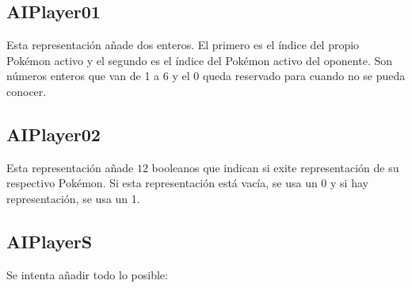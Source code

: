 \subsection*{AIPlayer01}

Esta representación añade dos enteros. El primero es el índice del propio Pokémon activo y el segundo es el índice del Pokémon activo del oponente. Son números enteros que van de 1 a 6 y el 0 queda reservado para cuando no se pueda conocer.

\subsection*{AIPlayer02}

Esta representación añade $12$ booleanos que indican si exite representación de su respectivo Pokémon. Si esta representación está vacía, se usa un 0 y si hay representación, se usa un 1.

\subsection*{AIPlayerS}

Se intenta añadir todo lo posible:

